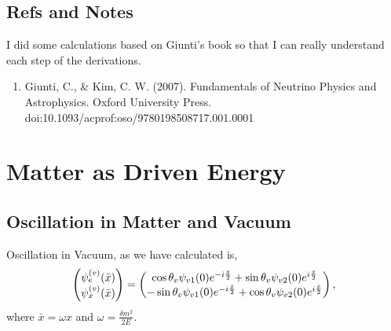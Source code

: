 \documentclass[letterpaper,12pt,english]{sphinxmanual}
\begin{document}
\section{Refs and Notes}
\label{parametric:refs-and-notes}
I did some calculations based on Giunti's book so that I can really understand each step of the derivations.
\begin{enumerate}
\item {} 
Giunti, C., \& Kim, C. W. (2007). Fundamentals of Neutrino Physics and Astrophysics. Oxford University Press. doi:10.1093/acprof:oso/9780198508717.001.0001

\end{enumerate}


\chapter{Matter as Driven Energy}
\label{matter-driven::doc}\label{matter-driven:matter-as-driven-energy}

\section{Oscillation in Matter and Vacuum}
\label{matter-driven:oscillation-in-matter-and-vacuum}
Oscillation in Vacuum, as we have calculated is,
\begin{gather}
\begin{split}\begin{pmatrix} \psi_{e}^{(v)} (\bar x) \\ \psi_{x}^{(v)} (\bar x)  \end{pmatrix} = \begin{pmatrix}  \cos\theta_v \psi_{v1}(0) e^{-i\frac{\bar x}{2}} + \sin \theta_v \psi_{v2}(0) e^{i\frac{\bar x}{2}} \\    -\sin\theta_v \psi_{v1}(0) e^{-i\frac{\bar x}{2}} + \cos \theta_v \psi_{v2}(0) e^{i\frac{\bar x}{2}}   \end{pmatrix},\end{split}\notag
\end{gather}
where \(\bar x = \omega x\) and \(\omega = \frac{\delta m^2 }{2E}\).
\end{document}

